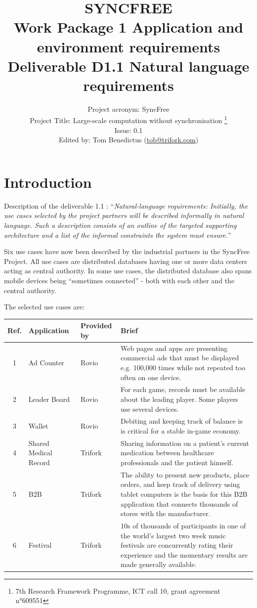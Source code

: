 \documentclass[11pt,a4paper]{report}
\title{{\Huge SYNCFREE} \\ Work Package 1 Application and environment requirements \\ Deliverable D1.1 Natural language requirements}
\author{Project acronym: SyncFree\\Project Title: Large-scale computation without synchronisation \thanks{7th Research Framework Programme, ICT call 10, grant agreement n°609551}\\Issue: 0.1\\Edited by: Tom Benedictus (\href{mailto:tob@trifork.com}{tob@trifork.com})}
\begin{document}
\maketitle

\newpage

\tableofcontents{}

\chapter{Introduction}

Description of the deliverable 1.1 : ``{\em Natural-language
  requirements: Initially, the use cases selected by the project
  partners will be described informally in natural language. Such a
  description consists of an outline of the targeted supporting
  architecture and a list of the informal constraints the system must
  ensure.}''

Six use cases have now been described by the industrial partners in
the SyncFree Project. All use cases are distributed databases having
one or more data centers acting as central authority.
In some use cases, the distributed database also spans mobile devices
being ``sometimes connected'' - both with each other and the central
authority.

The selected use cases are:

\begin{table}[htb] \centering
		\begin{tabular}{| c | l | l | p{8.5cm} |}
			\hline
			Ref. & Application & Provided by & Brief \\ \hline
			1 & Ad Counter & Rovio & Web pages and apps are presenting commercial ads that must be displayed e.g. 100,000 times while not repeated too often on one device.\\ \hline
			2 & Leader Board & Rovio & For each game, records must be available about the leading player. Some players use several devices. \\ \hline
			3 & Wallet & Rovio & Debiting and keeping track of balance is is critical for a stable in-game economy. \\ \hline
			4 & Shared Medical Record & Trifork & Sharing information on a patient's current medication between healthcare professionals and the patient himself. \\ \hline
			5 & B2B & Trifork & The ability to present new products, place orders, and keep track of delivery using tablet computers is the basis for this B2B application that connects thousands of stores with the manufacturer. \\ \hline
			6 & Festival & Trifork & 10s of thousands of participants in one of the world's largest two week music festivals are concurrently rating their experience and the momentary results are made generally available. \\ \hline
		\end{tabular}
\end{table}
              
\end{document}
